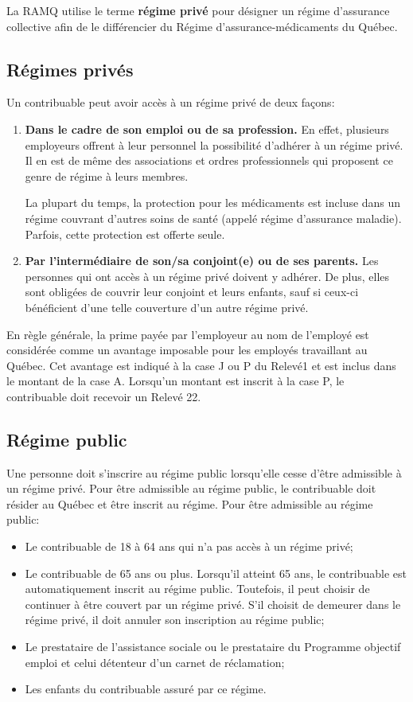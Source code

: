 La RAMQ utilise le terme \textbf{régime privé} pour désigner un régime d'assurance collective afin de le différencier du Régime d'assurance-médicaments du Québec. 


\subsection{Régimes privés}
Un contribuable peut avoir accès à un régime privé de deux façons:
\begin{enumerate}
	\item \textbf{Dans le cadre de son emploi ou de sa profession.} En effet, plusieurs employeurs offrent à leur personnel la possibilité d'adhérer à un régime privé. Il en est de même des associations et ordres professionnels qui proposent ce genre de régime à leurs membres.
	
	La plupart du temps, la protection pour les médicaments est incluse dans un régime couvrant d'autres soins de santé (appelé régime d'assurance maladie). Parfois, cette protection est offerte seule.
	\item \textbf{Par l'intermédiaire de son/sa conjoint(e) ou de ses parents.} Les personnes qui ont accès à un régime privé doivent y adhérer. De plus, elles sont obligées de couvrir leur conjoint et leurs enfants, sauf si ceux-ci bénéficient d'une telle couverture d'un autre régime privé.
\end{enumerate}

En règle générale, la prime payée par l'employeur au nom de l'employé est considérée comme un avantage imposable pour les employés travaillant au Québec. Cet avantage est indiqué à la case J ou P du Relevé1 et est inclus dans le montant de la case A. Lorsqu'un montant est inscrit à la case P, le contribuable doit recevoir un Relevé 22.


\subsection{Régime public}
Une personne doit s'inscrire au régime public lorsqu'elle cesse d'être admissible à un régime privé. Pour être admissible au régime public, le contribuable doit résider au Québec et être inscrit au régime. Pour être admissible au régime public:
\begin{itemize}[label=]
	\item Le contribuable de 18 à 64 ans qui n'a pas accès à un régime privé;
	\item Le contribuable de 65 ans ou plus. Lorsqu'il atteint 65 ans, le contribuable est automatiquement inscrit au régime public. Toutefois, il peut choisir de continuer à être couvert par un régime privé. S'il choisit de demeurer dans le régime privé, il doit annuler son inscription au régime public;
	\item Le prestataire de l'assistance sociale ou le prestataire du Programme objectif emploi et celui détenteur d'un carnet de réclamation;
	\item Les enfants du contribuable assuré par ce régime.
\end{itemize}

